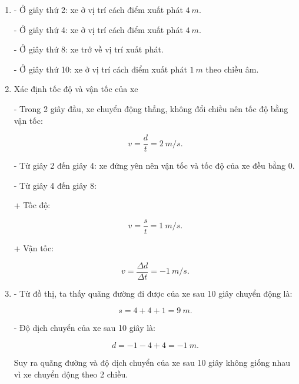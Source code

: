 \begin{enumerate}[label=\bfseries Bài \arabic*:]
{\begin{enumerate}[label=\alph*)]
			- Trong 2 giây đầu: xe chuyển động thẳng
			
			- Từ giây thứ 2 đến giây thứ 4: xe đứng yên
			
			- Từ giây thứ 4 đến giây thứ 10: xe chuyển động thẳng theo chiều ngược lại.
			
			- Từ giây thứ 9 đến giây thứ 10: xe dừng lại.
			
			\item 
			
			- Ở giây thứ 2: xe ở vị trí cách điểm xuất phát $\SI{4}{m}$.
			
			- Ở giây thứ 4: xe ở vị trí cách điểm xuất phát $\SI{4}{m}$.
			
			- Ở giây thứ 8: xe trở về vị trí xuất phát.
			
			- Ở giây thứ 10: xe ở vị trí cách điểm xuất phát $\SI{1}{m}$ theo chiều âm.
			\item Xác định tốc độ và vận tốc của xe
			
			- Trong 2 giây đầu, xe chuyển động thẳng, không đổi chiều nên tốc độ bằng vận tốc:
			
			$$v = \dfrac{d}{t} = \SI{2}{m/s}.$$
			
			- Từ giây 2 đến giây 4: xe đứng yên nên vận tốc và tốc độ của xe đều bằng 0.
			
			- Từ giây 4 đến giây 8:
			
			+ Tốc độ:
			
			$$v = \dfrac{s}{t} = \SI{1}{m/s}.$$
			
			+ Vận tốc:
			
			$$v = \dfrac{\Delta d}{\Delta t} = -\SI{1}{m/s}.$$
			\item
			- Từ đồ thị, ta thấy quãng đường đi được của xe sau 10 giây chuyển động là:
			
			$$s = 4 + 4 + 1 = \SI{9}{m}.$$
			
			- Độ dịch chuyển của xe sau 10 giây là:
			
			$$d = - 1 - 4 + 4 = - \SI{1}{m}.$$
			
			Suy ra quãng đường và độ dịch chuyển của xe sau 10 giây không giống nhau vì xe chuyển động theo 2 chiều.
		\end{enumerate}
	}
	
\end{enumerate}